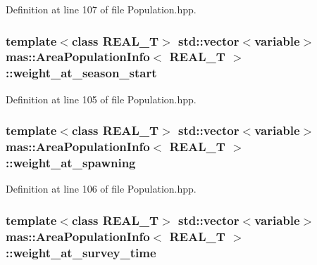 Definition at line 107 of file Population.\-hpp.

\hypertarget{structmas_1_1_area_population_info_a3c23c29d9a1521625a0a850e2964d966}{
\subsubsection[{weight\-\_\-at\-\_\-season\-\_\-start}]{\setlength{\rightskip}{0pt plus 5cm}template$<$class R\-E\-A\-L\-\_\-\-T$>$ std\-::vector$<${\bf variable}$>$ {\bf mas\-::\-Area\-Population\-Info}$<$ R\-E\-A\-L\-\_\-\-T $>$\-::weight\-\_\-at\-\_\-season\-\_\-start}}\label{structmas_1_1_area_population_info_a3c23c29d9a1521625a0a850e2964d966}


Definition at line 105 of file Population.\-hpp.

\hypertarget{structmas_1_1_area_population_info_a04ce0531dba318eb0da60cc2f5899787}{
\subsubsection[{weight\-\_\-at\-\_\-spawning}]{\setlength{\rightskip}{0pt plus 5cm}template$<$class R\-E\-A\-L\-\_\-\-T$>$ std\-::vector$<${\bf variable}$>$ {\bf mas\-::\-Area\-Population\-Info}$<$ R\-E\-A\-L\-\_\-\-T $>$\-::weight\-\_\-at\-\_\-spawning}}\label{structmas_1_1_area_population_info_a04ce0531dba318eb0da60cc2f5899787}


Definition at line 106 of file Population.\-hpp.

\hypertarget{structmas_1_1_area_population_info_ae5bf4e615534e995e26a1be48c9ace1d}{
\subsubsection[{weight\-\_\-at\-\_\-survey\-\_\-time}]{\setlength{\rightskip}{0pt plus 5cm}template$<$class R\-E\-A\-L\-\_\-\-T$>$ std\-::vector$<${\bf variable}$>$ {\bf mas\-::\-Area\-Population\-Info}$<$ R\-E\-A\-L\-\_\-\-T $>$\-::weight\-\_\-at\-\_\-survey\-\_\-time}}\label{structmas_1_1_area_population_info_ae5bf4e615534e995e26a1be48c9ace1d}


